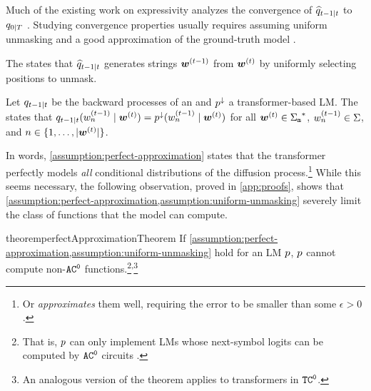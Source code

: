 \documentclass{article} %
\begin{document}
Much of the existing work on \MDMAcr expressivity analyzes the convergence of ${\widehat{q}}_{t - 1|t}$ to ${q}_{0|{T}}$ \citep{li2025convergencetheorydiffusionlanguage,chen2024convergenceanalysisdiscretediffusion,feng2025theoreticalbenefitlimitationdiffusion}.
Studying convergence properties usually requires assuming uniform unmasking and a good approximation of the ground-truth model \citep[e.g.,][]{li2025convergencetheorydiffusionlanguage,chen2024convergenceanalysisdiscretediffusion,feng2025theoreticalbenefitlimitationdiffusion,liu2025perfectdiffusionmathsftc0}.
\begin{assumption} \label{assumption:uniform-unmasking}
   The  states that ${\widehat{q}}_{t - 1|t}$ generates strings ${{\boldsymbol{w}}}^{(t - 1)}$ from ${{\boldsymbol{w}}}^{(t)}$ by uniformly selecting positions to unmask.
\end{assumption}
\begin{assumption} \label{assumption:perfect-approximation}
   Let ${{q}}_{t - 1|t}$ be the backward processes of an \MDMAcr and ${{{p}}^{\downarrow}}$ a transformer-based LM.
   The  states that
   ${{{q}}}_{t - 1|t}({{w}}^{(t - 1)}_{{n}} \mid {{\boldsymbol{w}}}^{(t)}) = {{{{p}}^{\downarrow}}({{w}}^{(t - 1)}_{{n}} \mid {{\boldsymbol{w}}}^{(t)})}$
   for all ${{\boldsymbol{w}}}^{(t)} \in {{{{{\Sigma}}_{{\texttt{m}}}}^{*}}}$, ${{w}}^{(t - 1)}_{{n}} \in {{\Sigma}}$, and ${{n}} \in \{1, \ldots, |{{\boldsymbol{w}}}^{(t)}|\}$.
\end{assumption}
In words, \cref{assumption:perfect-approximation} states that the transformer perfectly models \emph{all} conditional distributions of the diffusion process.\footnote{Or \emph{approximates} them well, requiring the error to be smaller than some $\epsilon > 0$.}
While this seems necessary, the following observation, proved in \cref{app:proofs}, shows that \cref{assumption:perfect-approximation,assumption:uniform-unmasking} severely limit the class of functions that the model can compute.
\begin{restatable}[]{theorem}{perfectApproximationTheorem} \label{thm:perfect-approximation-limitation} 
   If \cref{assumption:perfect-approximation,assumption:uniform-unmasking} hold for an LM ${{p}}$, ${{p}}$ cannot compute non-${{{{{{\mathtt{AC}}}^{\mathtt{0}}}}}}$ functions.\footnote{That is, ${{p}}$ can only implement LMs whose next-symbol logits can be computed by ${{{{{{\mathtt{AC}}}^{\mathtt{0}}}}}}$ circuits \citep{liu2025perfectdiffusionmathsftc0}.}\textsuperscript{,}\footnote{An analogous version of the theorem applies to transformers in ${{{{{{\mathtt{TC}}}^{\mathtt{0}}}}}}$.}
\end{restatable}
\end{document}
